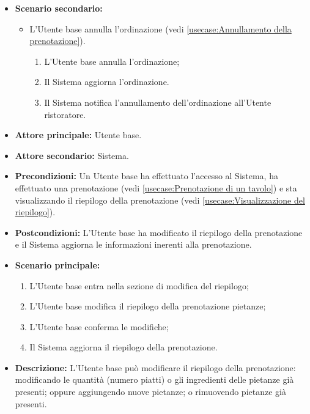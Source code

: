 \begin{itemize}
	\item \textbf{Scenario secondario:}
	      \begin{itemize}
		      \item L'Utente base annulla l'ordinazione (vedi
		            \autoref{usecase:Annullamento della prenotazione}).
		            \begin{enumerate}
			            \item L'Utente base annulla l'ordinazione;
			            \item Il Sistema aggiorna l'ordinazione.
			            \item Il Sistema notifica l'annullamento dell'ordinazione
			                  all'Utente ristoratore.
		            \end{enumerate}
	      \end{itemize}
\end{itemize}


\label{usecase:Aggiornamento del riepilogo}
\begin{itemize}
	\item \textbf{Attore principale:} Utente base.

	\item \textbf{Attore secondario:} Sistema.

	\item \textbf{Precondizioni:}
	      Un Utente base ha effettuato l'accesso al Sistema, ha effettuato una
	      prenotazione (vedi \autoref{usecase:Prenotazione di un tavolo}) e
	      sta visualizzando il riepilogo della prenotazione
	      (vedi \autoref{usecase:Visualizzazione del riepilogo}).

	\item \textbf{Postcondizioni:}
	      L'Utente base ha modificato il riepilogo della prenotazione e il Sistema
	      aggiorna le informazioni inerenti alla prenotazione.

	\item \textbf{Scenario principale:}
	      \begin{enumerate}
		      \item L'Utente base entra nella sezione di modifica del riepilogo;
		      \item L'Utente base modifica il riepilogo della prenotazione pietanze;
		      \item L'Utente base conferma le modifiche;
		      \item Il Sistema aggiorna il riepilogo della prenotazione.
	      \end{enumerate}

	\item \textbf{Descrizione:} L'Utente base può modificare il riepilogo della
	      prenotazione: modificando le quantità (numero piatti) o gli
	      ingredienti delle pietanze già presenti; oppure aggiungendo nuove
	      pietanze; o rimuovendo pietanze già presenti.
\end{itemize}
